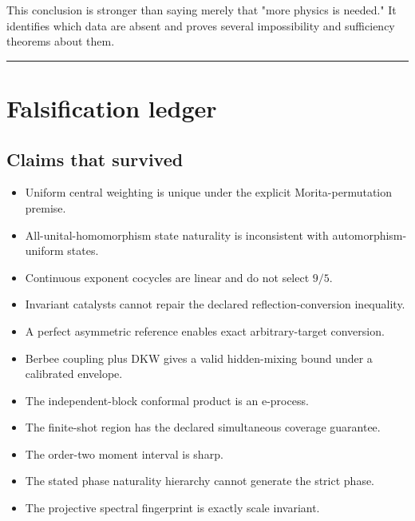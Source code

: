 \documentclass[11pt,a4paper,openany]{report}
\begin{document}
This conclusion is stronger than saying merely that "more physics is needed." It identifies which data are absent and proves several impossibility and sufficiency theorems about them.

\par\medskip\hrule\medskip

\chapter{Falsification ledger}

\section{Claims that survived}

\begin{itemize}
\item 
Uniform central weighting is unique under the explicit Morita-permutation premise.

\item 
All-unital-homomorphism state naturality is inconsistent with automorphism-uniform states.

\item 
Continuous exponent cocycles are linear and do not select \(9/5\).

\item 
Invariant catalysts cannot repair the declared reflection-conversion inequality.

\item 
A perfect asymmetric reference enables exact arbitrary-target conversion.

\item 
Berbee coupling plus DKW gives a valid hidden-mixing bound under a calibrated envelope.

\item 
The independent-block conformal product is an e-process.

\item 
The finite-shot region has the declared simultaneous coverage guarantee.

\item 
The order-two moment interval is sharp.

\item 
The stated phase naturality hierarchy cannot generate the strict phase.

\item 
The projective spectral fingerprint is exactly scale invariant.

\end{itemize}
\end{document}
